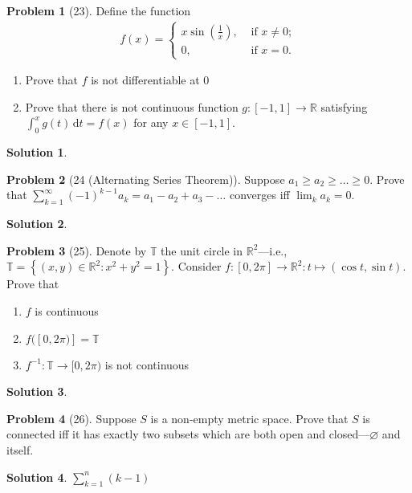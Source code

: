 \documentclass[12pt]{article}
\theoremstyle{definition} %
\newtheorem{solution}{Solution}
\newtheorem{problem}{Problem}
\theoremstyle{plain} %
\begin{document}
\begin{problem}[23]
   Define the function 
   \begin{align}
  f(x) = \begin{cases}
    x\sin(\frac{1}{x}), &\text{ if }  x\neq 0;\\
    0, &\text{ if }  x=0.
  \end{cases}  
   \end{align} 
   \begin{enumerate}
    \item Prove that $f$ is not differentiable at $0$ 
    \item Prove that there is not continuous function $g:[-1,1]\to \mathbb{{R}}$ satisfying $\int_{0}^{x} g(t) \,\mathrm{d}t =f(x)$ for any $x\in [-1,1]$.  
   \end{enumerate}
\end{problem}
\begin{solution}
    
\end{solution}
\begin{problem}[24 (Alternating Series Theorem)]
   Suppose $a_1\geq a_2\geq \ldots \geq 0 $. Prove that $\sum_{k=1}^{\infty} (-1)^{k-1}a_{k}=a_{1}-a_{2}+a_3 - \ldots   $ converges iff $\lim_{k}a_{k}=0 $.   
\end{problem}
\begin{solution}
    
\end{solution}
\begin{problem}[25]
    Denote by $\mathbb{{T}}$ the unit circle in $\mathbb{{R}}^{2}$—i.e.,$\mathbb{{T}}=\left\{ (x,y)\in \mathbb{{R}}^{2}:x^{2}+y^{2}=1 \right\} $. Consider $f:[0,2\pi]\to \mathbb{{R}}^{2}: t\mapsto (\cos t, \sin t)$. Prove that
    \begin{enumerate}
        \item $f$ is continuous
        \item $f([0,2\pi)]=\mathbb{{T}}$
        \item $f^{-1}:\mathbb{{T}}\to [0,2\pi)$ is not continuous  
    \end{enumerate}   
\end{problem}
\begin{solution}
    
\end{solution}
\begin{problem}[26]
   Suppose $S$ is a non-empty metric space. Prove that $S$ is connected iff it has exactly two subsets which are both open and closed—$\varnothing $ and itself. 
\end{problem}
\begin{solution}
   $\sum_{k=1}^{n} (k-1)$  
\end{solution}
\end{document}
